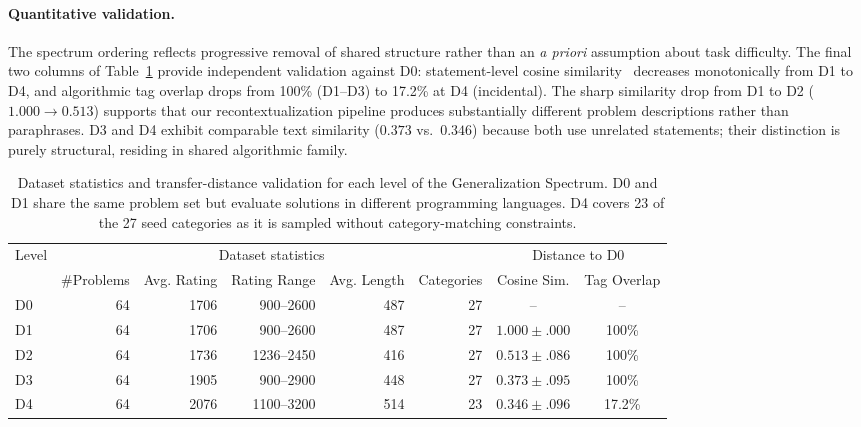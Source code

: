 \documentclass[]{bytedance_seed}
\theoremstyle{plain}
\theoremstyle{definition}
\theoremstyle{remark}
\begin{document}
\paragraph{Quantitative validation.}
The spectrum ordering reflects progressive removal of shared structure rather than an \emph{a priori} assumption about task difficulty. The final two columns of Table~\ref{tab:dataset-stats} provide independent validation against D0: statement-level cosine similarity~\citep{reimers2019sentence} decreases monotonically from D1 to D4, and algorithmic tag overlap drops from 100\% (D1--D3) to 17.2\% at D4 (incidental). The sharp similarity drop from D1 to D2 ($1.000 \to 0.513$) supports that our recontextualization pipeline produces substantially different problem descriptions rather than paraphrases. D3 and D4 exhibit comparable text similarity ($0.373$ vs.\ $0.346$) because both use unrelated statements; their distinction is purely structural, residing in shared algorithmic family.

\begin{table}[t]
\centering
\caption{Dataset statistics and transfer-distance validation for each level of the Generalization Spectrum. D0 and D1 share the same problem set but evaluate solutions in different programming languages. D4 covers 23 of the 27 seed categories as it is sampled without category-matching constraints.}
\label{tab:dataset-stats}
\small
\setlength{\tabcolsep}{4pt}
\begin{tabular*}{\textwidth}{@{\extracolsep{\fill}}lrrrrrcc@{}}
\toprule
\multirow{2}{*}{Level} & \multicolumn{5}{c}{Dataset statistics} & \multicolumn{2}{c}{Distance to D0} \\
\cmidrule(lr){2-6} \cmidrule(l){7-8}
& \#Problems & Avg. Rating & Rating Range & Avg. Length & Categories & Cosine Sim. & Tag Overlap \\
\midrule
D0 & 64 & 1706 & 900--2600 & 487 & 27 & -- & -- \\
D1 & 64 & 1706 & 900--2600 & 487 & 27 & $1.000 \pm .000$ & 100\% \\
D2 & 64 & 1736 & 1236--2450 & 416 & 27 & $0.513 \pm .086$ & 100\% \\
D3 & 64 & 1905 & 900--2900 & 448 & 27 & $0.373 \pm .095$ & 100\% \\
D4 & 64 & 2076 & 1100--3200 & 514 & 23 & $0.346 \pm .096$ & 17.2\% \\
\bottomrule
\end{tabular*}
\end{table}
\FloatBarrier
\end{document}
